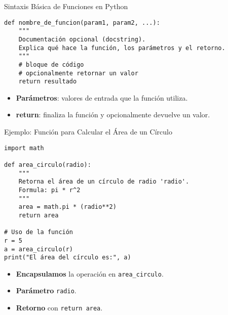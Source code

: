 \documentclass[10pt]{beamer}
\begin{document}
\begin{frame}[fragile]{Sintaxis Básica de Funciones en Python}
\begin{verbatim}
def nombre_de_funcion(param1, param2, ...):
    """
    Documentación opcional (docstring).
    Explica qué hace la función, los parámetros y el retorno.
    """
    # bloque de código
    # opcionalmente retornar un valor
    return resultado
\end{verbatim}
\vspace{-1cm}
\begin{itemize}
  \item \textbf{Parámetros}: valores de entrada que la función utiliza.
  \item \textbf{return}: finaliza la función y opcionalmente devuelve un valor.
\end{itemize}
\end{frame}

\begin{frame}[fragile]{Ejemplo: Función para Calcular el Área de un Círculo}
\begin{verbatim}
import math

def area_circulo(radio):
    """
    Retorna el área de un círculo de radio 'radio'.
    Formula: pi * r^2
    """
    area = math.pi * (radio**2)
    return area

# Uso de la función
r = 5
a = area_circulo(r)
print("El área del círculo es:", a)
\end{verbatim}
\vspace{-1.0cm}
\begin{itemize}\small
  \item \textbf{Encapsulamos} la operación en \texttt{area\_circulo}.
  \item \textbf{Parámetro} \texttt{radio}.
  \item \textbf{Retorno} con \texttt{return area}.
\end{itemize}
\end{frame}
\end{document}
